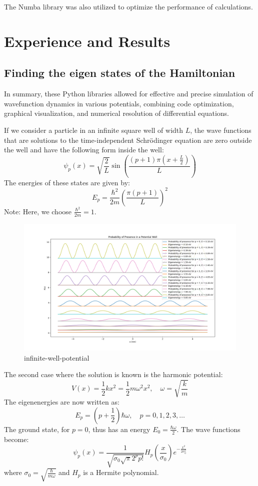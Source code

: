 \documentclass[12pt,french]{article}
\begin{document}
The Numba library was also utilized to optimize the performance of calculations.

\section{Experience and Results}

\subsection{Finding the eigen states of the Hamiltonian}
In summary, these Python libraries allowed for effective and precise simulation of wavefunction dynamics in various potentials, combining code optimization, graphical visualization, and numerical resolution of differential equations.

If we consider a particle in an infinite square well of width \( L \), the wave functions that are solutions to the time-independent Schrödinger equation are zero outside the well and have the following form inside the well:
\[
\psi_p(x) = \sqrt{\frac{2}{L}} \sin\left(\frac{(p + 1)\pi(x + \frac{L}{2})}{L}\right)
\]
The energies of these states are given by:
\[
E_p = \frac{\hbar^2}{2m} \left(\frac{\pi(p + 1)}{L}\right)^2
\]
Note: Here, we choose \(\frac{\hbar^2}{2m} = 1\).


\begin{figure}[h!]
  \centering
  \includegraphics[width=0.7\linewidth]{Partie_I/Puit_de_potentiel.png}
  \caption{infinite-well-potential}
  \label{fig:well}
\end{figure}
  
The second case where the solution is known is the harmonic potential:
\[
V(x) = \frac{1}{2} k x^2 = \frac{1}{2} m \omega^2 x^2, \quad \omega = \sqrt{\frac{k}{m}}
\]
The eigenenergies are now written as:
\[
E_p = \left(p + \frac{1}{2}\right) \hbar \omega, \quad p = 0, 1, 2, 3, \ldots
\]
The ground state, for \( p = 0 \), thus has an energy \( E_0 = \frac{\hbar \omega}{2} \).
The wave functions become:
\[
\psi_p(x) = \frac{1}{\sqrt{\sigma_0 \sqrt{\pi} 2^p p!}} H_p\left(\frac{x}{\sigma_0}\right) e^{-\frac{x^2}{2\sigma_0^2}}
\]
where \( \sigma_0 = \sqrt{\frac{\hbar}{m \omega}} \) and \( H_p \) is a Hermite polynomial.
\end{document}
